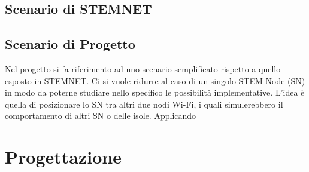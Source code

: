 \documentclass[a4paper,11pt]{report}
\begin{document}
\section{Scenario di STEMNET}

\section{Scenario di Progetto}
Nel progetto si fa riferimento ad uno scenario semplificato rispetto a quello esposto in STEMNET.
Ci si vuole ridurre al caso di un singolo STEM-Node (SN) in modo da poterne studiare nello specifico le possibilità implementative.
L'idea è quella di posizionare lo SN tra altri due nodi Wi-Fi, i quali simulerebbero il comportamento di altri SN o delle isole.
Applicando 

\chapter{Progettazione}
\end{document}

